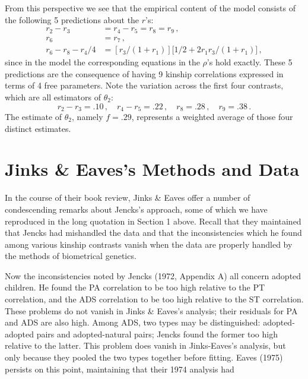 ﻿\documentclass[12pt]{article}
\begin{document}
From this perspective we see that the empirical content of the model consists of the following 5 predictions about the $r$'s:
\begin{align*}
r_2 - r_3 &= r_4 - r_5 = r_8 = r_9 \, , \\
r_6 &= r_7 \, , \\
r_6 - r_8 - r_4/4 &= [r_3/(1+r_1)]\big[1/2 + 2 r_1 r_3/(1+r_1)\big] \, ,
\end{align*}
since in the model the corresponding equations in the $\rho$'s hold exactly. These 5 predictions are the consequence of having 9 kinship correlations expressed in terms of 4 free parameters. Note the variation across the first four contrasts, which are all estimators of $\theta_2$:
\begin{equation*}
r_2 - r_3 = .10 \, , \quad r_4 - r_5 = .22 \, , \quad r_8 = .28 \, , \quad r_9 = .38 \, .
\end{equation*}
The estimate of $\theta_2$, namely $f=.29$, represents a weighted average of those four distinct estimates.

\section{Jinks \& Eaves's Methods and Data}

In the course of their book review, Jinks \& Eaves offer a number of condescending remarks about Jencks's approach, some of which we have reproduced in the long quotation in Section 1 above. Recall that they maintained that Jencks had mishandled the data and that the inconsistencies which he found among various kinship contrasts vanish when the data are properly handled by the methods of biometrical genetics.

Now the inconsistencies noted by Jencks (1972, Appendix A) all concern adopted children. He found the PA correlation to be too high relative to the PT correlation, and the ADS correlation to be too high relative to the ST correlation. These problems do not vanish in Jinks \& Eaves's analysis; their residuals for PA and ADS are also high. Among ADS, two types may be distinguished: adopted-adopted pairs and adopted-natural pairs; Jencks found the former too high relative to the latter. This problem does vanish in Jinks-Eaves's analysis, but only because they pooled the two types together before fitting. Eaves (1975) persists on this point, maintaining that their 1974 analysis had
\end{document}
